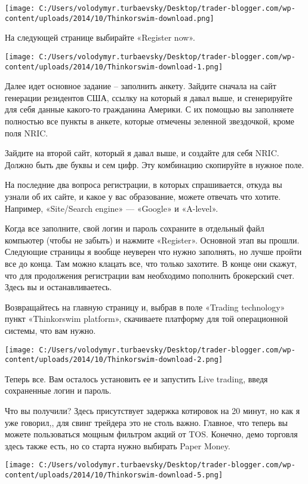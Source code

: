 \documentclass[a5paper]{article}
\begin{document}
\texttt{[image: C:/Users/volodymyr.turbaevsky/Desktop/trader-blogger.com/wp-content/uploads/2014/10/Thinkorswim-download.png]}

На следующей странице выбирайте «Register now».

\texttt{[image: C:/Users/volodymyr.turbaevsky/Desktop/trader-blogger.com/wp-content/uploads/2014/10/Thinkorswim-download-1.png]}

Далее идет основное задание – заполнить анкету. Зайдите сначала на сайт генерации резидентов США, ссылку на который я давал выше, и сгенерируйте для себя данные какого-то гражданина Америки. С их помощью вы заполняете полностью все пункты в анкете, которые отмечены зеленной звездочкой, кроме поля NRIC.

Зайдите на второй сайт, который я давал выше, и создайте для себя NRIC. Должно быть две буквы и сем цифр. Эту комбинацию скопируйте в нужное поле.

На последние два вопроса регистрации, в которых спрашивается, откуда вы узнали об их сайте, и какое у вас образование, можете отвечать что хотите. Например, «Site/Search engine» — «Google» и «A-level».

Когда все заполните, свой логин и пароль сохраните в отдельный файл компьютер (чтобы не забыть) и нажмите «Register». Основной этап вы прошли. Следующие страницы я вообще неуверен что нужно заполнять, но лучше пройти все до конца. Там можно клацать все, что только захотите. В конце они скажут, что для продолжения регистрации вам необходимо пополнить брокерский счет. Здесь вы и останавливаетесь.

Возвращайтесь на главную страницу и, выбрав в поле «Trading
technology» пункт «Thinkorswim platform»,  скачиваете платформу для
той операционной системы, что вам нужно.

\texttt{[image: C:/Users/volodymyr.turbaevsky/Desktop/trader-blogger.com/wp-content/uploads/2014/10/Thinkorswim-download-2.png]}

Теперь все. Вам осталось установить ее и запустить Live trading, введя сохраненные логин и пароль.

Что вы получили? Здесь присутствует задержка котировок на 20 минут, но
как я уже говорил,, для свинг трейдера это не столь важно. Главное,
что теперь вы можете пользоваться мощным фильтром акций от
TOS. Конечно, демо торговля здесь также есть, но со старта нужно
выбирать Paper Money.

\texttt{[image: C:/Users/volodymyr.turbaevsky/Desktop/trader-blogger.com/wp-content/uploads/2014/10/Thinkorswim-download-5.png]}
\end{document}
